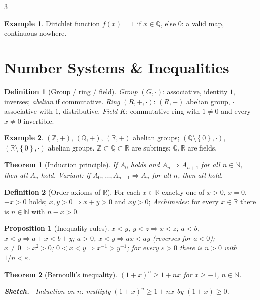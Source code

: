 \documentclass[10pt,a4paper,landscape]{article}
\theoremstyle{definition}
\newtheorem{defn}{Definition}[section]
\newtheorem{exm}{Example}[section]
\theoremstyle{plain}
\newtheorem{thm}{Theorem}[section]
\newtheorem{prop}{Proposition}[section]
\theoremstyle{remark}
\newcommand{\R}{\mathbb{R}}
\newcommand{\N}{\mathbb{N}}
\newcommand{\Z}{\mathbb{Z}}
\newcommand{\Q}{\mathbb{Q}}
\newcommand{\eps}{\varepsilon}
\newcommand{\set}[1]{\left\{ #1 \right\}}
\newenvironment{proofsketch}{%
  \par\small\color{exgray}\textbf{Sketch.}\ }%
  {\par}
\begin{document}
\begin{multicols*}{3}
\begin{exm}
Dirichlet function $f(x) = 1$ if $x \in \Q$, else $0$: a valid map, continuous nowhere.
\end{exm}

\section{Number Systems \& Inequalities}

\begin{defn}[Group / ring / field]
\emph{Group} $(G,\cdot)$: associative, identity $1$, inverses; \emph{abelian} if commutative.
\emph{Ring} $(R,+,\cdot)$: $(R,+)$ abelian group, $\cdot$ associative with $1$, distributive.
\emph{Field} $K$: commutative ring with $1 \neq 0$ and every $x \neq 0$ invertible.
\end{defn}

\begin{exm}
$(\Z,+)$, $(\Q,+)$, $(\R,+)$ abelian groups; $(\Q\setminus\set{0},\cdot)$, $(\R\setminus\set{0},\cdot)$ abelian groups. $\Z \subset \Q \subset \R$ are subrings; $\Q,\R$ are fields.
\end{exm}

\begin{thm}[Induction principle]
If $A_0$ holds and $A_n \Rightarrow A_{n+1}$ for all $n \in \N$, then all $A_n$ hold. Variant: if $A_0,\dots,A_{n-1} \Rightarrow A_n$ for all $n$, then all hold.
\end{thm}

\begin{defn}[Order axioms of $\R$]
For each $x \in \R$ exactly one of $x>0$, $x=0$, $-x>0$ holds; $x,y>0 \Rightarrow x+y>0$ and $xy>0$; \emph{Archimedes}: for every $x \in \R$ there is $n \in \N$ with $n - x > 0$.
\end{defn}

\begin{prop}[Inequality rules]
$x<y$, $y<z \Rightarrow x<z$; $a<b$, $x<y \Rightarrow a+x<b+y$; $a>0$, $x<y \Rightarrow ax<ay$ (reverses for $a<0$); $x \neq 0 \Rightarrow x^2>0$; $0<x<y \Rightarrow x^{-1}>y^{-1}$; for every $\eps>0$ there is $n>0$ with $1/n<\eps$.
\end{prop}

\begin{thm}[Bernoulli's inequality]
$(1+x)^n \ge 1 + nx$ for $x \ge -1$, $n \in \N$.
\begin{proofsketch}
Induction on $n$: multiply $(1+x)^n \ge 1+nx$ by $(1+x) \ge 0$.
\end{proofsketch}
\end{thm}


\end{multicols*}
\end{document}
